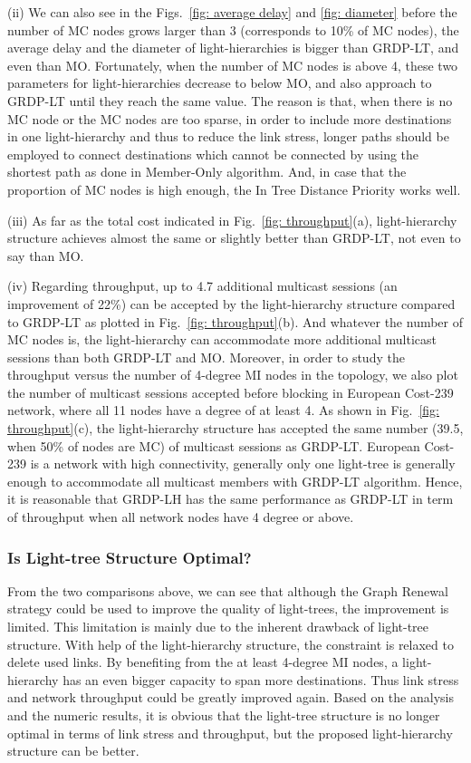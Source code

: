 \documentclass[conference]{IEEEtran}
\begin{document}
(ii) We can also see in the Figs.~\ref{fig: average delay} and \ref{fig: diameter} before the number of MC nodes grows larger than 3 (corresponds to 10\% of MC nodes), the average delay and the diameter of light-hierarchies is bigger than GRDP-LT, and even than MO. Fortunately, when the number of MC nodes is above 4, these two parameters for light-hierarchies decrease to below MO, and also approach to GRDP-LT until they reach the same value. The reason is that, when there is no MC node or the MC nodes are too sparse, in order to include more destinations in one light-hierarchy and thus to reduce the link stress, longer paths should be employed to connect destinations which cannot be connected by using the shortest path as done in Member-Only algorithm. And, in case that the proportion of MC nodes is high enough, the In Tree Distance Priority works well.

(iii) As far as the total cost indicated in Fig.~\ref{fig: throughput}(a), light-hierarchy structure achieves almost the same or slightly better than GRDP-LT, not even to say than MO.

(iv) Regarding throughput, up to 4.7 additional multicast sessions (an improvement of 22\%) can be accepted by the light-hierarchy structure compared to GRDP-LT as plotted in Fig.~\ref{fig: throughput}(b). And whatever the number of MC nodes is, the light-hierarchy can accommodate more additional multicast sessions than both GRDP-LT and MO. Moreover, in order to study the throughput versus the number of 4-degree MI nodes in the topology, we also plot the number of multicast sessions accepted before blocking in European Cost-239 network, where all 11 nodes have a degree of at least 4. As shown in Fig.~\ref{fig: throughput}(c), the light-hierarchy structure has accepted the same number (39.5, when 50\% of nodes are MC) of multicast sessions as GRDP-LT. European Cost-239 is a network with high connectivity, generally only one light-tree is generally enough to accommodate all multicast members with GRDP-LT algorithm. Hence, it is reasonable that GRDP-LH has the same performance as GRDP-LT in term of throughput when all network nodes have 4 degree or above.

\subsubsection{Is Light-tree Structure Optimal?}
\label{subsubsec: Is Light-tree Structure Optimal?}
From the two comparisons above, we can see that although the Graph Renewal strategy could be used to improve the quality of light-trees, the improvement is limited. This limitation is mainly due to the inherent drawback of light-tree structure. With help of the light-hierarchy structure, the constraint is relaxed to delete used links. By benefiting from the at least 4-degree MI nodes, a light-hierarchy has an even bigger capacity to span more destinations. Thus link stress and network throughput could be greatly improved again. Based on the analysis and the numeric results, it is obvious that the light-tree structure is no longer optimal in terms of link stress and throughput, but the proposed light-hierarchy structure can be better.
\end{document}
